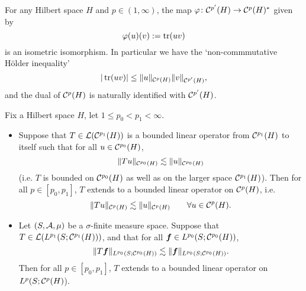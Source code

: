 
\begin{prop}[Duality]\label{prop:Schatten-duality}
  For any Hilbert space $H$ and $p \in (1,\infty)$, the map $\varphi \colon \mathcal{C}^{p'}(H) \rightarrow \mathcal{C}^{p}(H)^*$ given by
  \begin{equation*}
    \varphi(u)(v) := \operatorname{tr}(uv)
  \end{equation*}
  is an isometric isomorphism.
  In particular we have the `non-commmutative H\"older inequality'
  \begin{equation*}
    |\operatorname{tr}(uv)| \leq \|u\|_{\mathcal{C}^{p}(H)} \|v\|_{\mathcal{C}^{p'}(H)},
  \end{equation*}
  and the dual of $\mathcal{C}^{p}(H)$ is naturally identified with $\mathcal{C}^{p'}(H)$.
\end{prop}

\begin{prop}[Interpolation]\label{prop:Schatten-interpolation}
  Fix a Hilbert space $H$, let $1 \leq p_0 < p_1 < \infty$.
  \begin{itemize}
  \item Suppose that $T \in \mathcal{L}(\mathcal{C}^{p_{1}}(H))$ is a bounded linear operator from $\mathcal{C}^{p_{1}}(H)$ to itself such that for all $u \in \mathcal{C}^{p_{0}}(H)$,
  \begin{equation*}
    \|Tu\|_{\mathcal{C}^{p_{0}}(H)} \lesssim \|u\|_{\mathcal{C}^{p_{0}}(H)}
  \end{equation*}
  (i.e. $T$ is bounded on $\mathcal{C}^{p_0}(H)$ as well as on the larger space $\mathcal{C}^{p_1}(H)$).
  Then for all $p \in [p_0,p_1]$, $T$ extends to a bounded linear operator on $\mathcal{C}^{p}(H)$, i.e.
  \begin{equation*}
    \|Tu\|_{\mathcal{C}^{p}(H)} \lesssim \|u\|_{\mathcal{C}^{p}(H)} \qquad \forall u \in \mathcal{C}^{p}(H).
  \end{equation*}

\item Let $(S,\mathcal{A},\mu)$ be a $\sigma$-finite measure space.
  Suppose that $T \in \mathcal{L}(L^{p_1}(S;\mathcal{C}^{p_{1}}(H)))$, and that for all $\bm{f} \in L^{p_0}(S;\mathcal{C}^{p_{0}}(H))$,
  \begin{equation*}
    \|T\bm{f}\|_{L^{p_0}(S;\mathcal{C}^{p_{0}}(H))} \lesssim \|\bm{f}\|_{L^{p_0}(S;\mathcal{C}^{p_{0}}(H))}.
  \end{equation*}
  Then for all $p \in [p_0,p_1]$, $T$ extends to a bounded linear operator on $L^{p}(S;\mathcal{C}^{p}(H)$).
  \end{itemize}
\end{prop}

